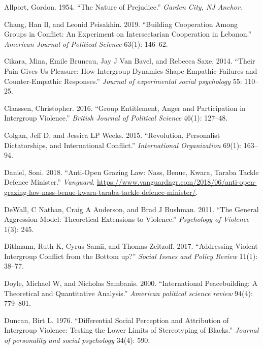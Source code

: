 \documentclass[11pt]{article}
\begin{document}
\leavevmode\hypertarget{ref-allport1954prejudice}{}%
Allport, Gordon. 1954. ``The Nature of Prejudice.'' \emph{Garden City,
NJ Anchor}.

\leavevmode\hypertarget{ref-chang2019building}{}%
Chang, Han Il, and Leonid Peisakhin. 2019. ``Building Cooperation Among
Groups in Conflict: An Experiment on Intersectarian Cooperation in
Lebanon.'' \emph{American Journal of Political Science} 63(1): 146--62.

\leavevmode\hypertarget{ref-cikara2014their}{}%
Cikara, Mina, Emile Bruneau, Jay J Van Bavel, and Rebecca Saxe. 2014.
``Their Pain Gives Us Pleasure: How Intergroup Dynamics Shape Empathic
Failures and Counter-Empathic Responses.'' \emph{Journal of experimental
social psychology} 55: 110--25.

\leavevmode\hypertarget{ref-claassen2016group}{}%
Claassen, Christopher. 2016. ``Group Entitlement, Anger and
Participation in Intergroup Violence.'' \emph{British Journal of
Political Science} 46(1): 127--48.

\leavevmode\hypertarget{ref-colgan2015revolution}{}%
Colgan, Jeff D, and Jessica LP Weeks. 2015. ``Revolution, Personalist
Dictatorships, and International Conflict.'' \emph{International
Organization} 69(1): 163--94.

\leavevmode\hypertarget{ref-daniel2018anti}{}%
Daniel, Soni. 2018. ``Anti-Open Grazing Law: Nass, Benue, Kwara, Taraba
Tackle Defence Minister.'' \emph{Vanguard}.
\url{https://www.vanguardngr.com/2018/06/anti-open-grazing-law-nass-benue-kwara-taraba-tackle-defence-minister/}.

\leavevmode\hypertarget{ref-dewall2011general}{}%
DeWall, C Nathan, Craig A Anderson, and Brad J Bushman. 2011. ``The
General Aggression Model: Theoretical Extensions to Violence.''
\emph{Psychology of Violence} 1(3): 245.

\leavevmode\hypertarget{ref-ditlmann2017addressing}{}%
Ditlmann, Ruth K, Cyrus Samii, and Thomas Zeitzoff. 2017. ``Addressing
Violent Intergroup Conflict from the Bottom up?'' \emph{Social Issues
and Policy Review} 11(1): 38--77.

\leavevmode\hypertarget{ref-doyle2000international}{}%
Doyle, Michael W, and Nicholas Sambanis. 2000. ``International
Peacebuilding: A Theoretical and Quantitative Analysis.'' \emph{American
political science review} 94(4): 779--801.

\leavevmode\hypertarget{ref-duncan1976differential}{}%
Duncan, Birt L. 1976. ``Differential Social Perception and Attribution
of Intergroup Violence: Testing the Lower Limits of Stereotyping of
Blacks.'' \emph{Journal of personality and social psychology} 34(4):
590.
\end{document}
